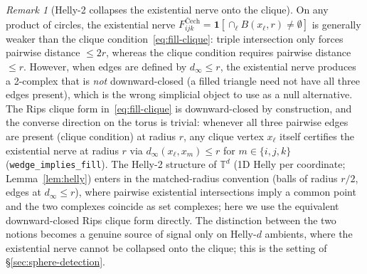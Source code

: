\documentclass[reqno,12pt]{amsart}
\newcommand{\TT}{\mathbb{T}}         %
\newcommand{\lean}[1]{\textup{\texttt{\small #1}}}
\theoremstyle{plain}
\theoremstyle{definition}
\theoremstyle{remark}
\newtheorem{remark}[theorem]{Remark}
\begin{document}
\begin{remark}[Helly-2 collapses the existential nerve onto the clique]\label{rem:helly2-collapse}
On any product of circles, the existential nerve $F^{\text{\v{C}ech}}_{ijk} =
\mathbf{1}[\cap_\ell B(x_\ell, r) \neq \emptyset]$ is generally weaker than the clique
condition~\eqref{eq:fill-clique}: triple intersection only forces pairwise distance
$\le 2r$, whereas the clique condition requires pairwise distance $\le r$. However, when
edges are defined by $d_\infty \le r$, the existential nerve produces a 2-complex that is
\emph{not} downward-closed (a filled triangle need not have all three edges present),
which is the wrong simplicial object to use as a null alternative. The Rips clique form
in~\eqref{eq:fill-clique} is downward-closed by construction, and the converse direction
on the torus is trivial: whenever all three pairwise edges are present (clique condition)
at radius $r$, any clique vertex $x_\ell$ itself certifies the existential nerve at
radius $r$ via $d_\infty(x_\ell, x_m) \le r$ for $m \in \{i,j,k\}$
(\lean{wedge\_implies\_fill}). The Helly-2 structure of $\TT^d$ (1D Helly per coordinate;
Lemma~\ref{lem:helly}) enters in the matched-radius convention (balls of radius $r/2$,
edges at $d_\infty \le r$), where pairwise existential intersections imply a common point
and the two complexes coincide as set complexes; here we use the equivalent
downward-closed Rips clique form directly. The distinction between the two notions becomes
a genuine source of signal only on Helly-$d$ ambients, where the existential nerve cannot
be collapsed onto the clique; this is the setting of \S\ref{sec:sphere-detection}.
\end{remark}
\end{document}
